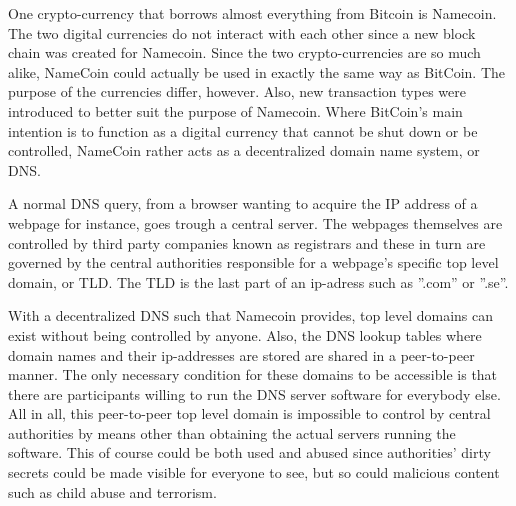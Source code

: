 One crypto-currency that borrows almost everything from Bitcoin is Namecoin\cite{CryptoCoinInsider:2014:Online}. The two digital currencies do not interact with each other since a new block chain was created for Namecoin. Since the two crypto-currencies are so much alike, NameCoin could actually be used in exactly the same way as BitCoin. The purpose of the currencies differ, however. Also, new transaction types were introduced to better suit the purpose of Namecoin. Where BitCoin’s main intention is to function as a digital currency that cannot be shut down or be controlled, NameCoin rather acts as a decentralized domain name system, or DNS.

A normal DNS query, from a browser wanting to acquire the IP address of a webpage for instance, goes trough a central server\cite{CryptoCoinInsider:2014:Online}. The webpages themselves are controlled by third party companies known as registrars and these in turn are governed by the central authorities responsible for a webpage’s specific top level domain, or TLD. The TLD is the last part of an ip-adress such as ”.com” or ”.se”.

With a decentralized DNS such that Namecoin provides, top level domains can exist without being controlled by anyone\cite{CryptoCoinInsider:2014:Online}. Also, the DNS lookup tables where domain names and their ip-addresses are stored are shared in a peer-to-peer manner. The only necessary condition for these domains to be accessible is that there are participants willing to run the DNS server software for everybody else. All in all, this peer-to-peer top level domain is impossible to control by central authorities by means other than obtaining the actual servers running the software. This of course could be both used and abused since authorities’ dirty secrets could be made visible for everyone to see, but so could malicious content such as child abuse and terrorism.
